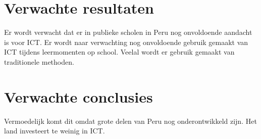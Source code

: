 
\section{Verwachte resultaten}
\label{sec:verwachte_resultaten}
Er wordt verwacht dat er in publieke scholen in Peru nog onvoldoende aandacht is voor ICT. Er wordt naar verwachting nog onvoldoende gebruik gemaakt van ICT tijdens leermomenten op school. Veelal wordt er gebruik gemaakt van traditionele methoden.

\section{Verwachte conclusies}
\label{sec:verwachte_conclusies}
Vermoedelijk komt dit omdat grote delen van Peru nog onderontwikkeld zijn. Het land investeert te weinig in ICT.

